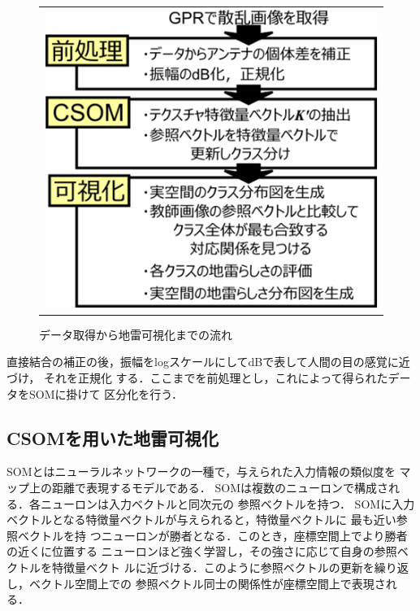 ﻿\documentclass[12pt,oneside]{jsbook}
\begin{document}
\begin{figure}[btp]
\begin{center}
\begin{tabular}{c}
\begin{minipage}{0.4\hsize}
\caption{直接結合と補正のための経路長}
\label{dc}      
   \end{minipage}
   \begin{minipage}{0.6\hsize}
\includegraphics[width =\hsize ]{flowchart.png}
\caption{データ取得から地雷可視化までの流れ}
\label{flow}          
   \end{minipage}
  \end{tabular}
 \end{center}
\end{figure}

直接結合の補正の後，振幅をlogスケールにしてdBで表して人間の目の感覚に近づけ，
それを正規化
する．ここまでを前処理とし，これによって得られたデータをSOMに掛けて
区分化を行う．
\subsection{CSOMを用いた地雷可視化}
SOMとはニューラルネットワークの一種で，与えられた入力情報の類似度を
マップ上の距離で表現するモデルである．
SOMは複数のニューロンで構成される．各ニューロンは入力ベクトルと同次元の
参照ベクトルを持つ．
SOMに入力ベクトルとなる特徴量ベクトルが与えられると，特徴量ベクトルに
最も近い参照ベクトルを持
つニューロンが勝者となる．このとき，座標空間上でより勝者の近くに位置する
ニューロンほど強く学習し，その強さに応じて自身の参照ベクトルを特徴量ベクト
ルに近づける．このように参照ベクトルの更新を繰り返し，ベクトル空間上での
参照ベクトル同士の関係性が座標空間上で表現される．
\end{document}
